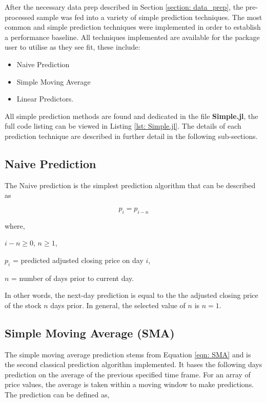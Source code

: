 After the necessary data prep described in Section \ref{section: data_prep}, the pre-processed sample was fed into a variety of simple prediction techniques. The most common and simple prediction techniques were implemented in order to establish a performance baseline. All techniques implemented are available for the package user to utilise as they see fit, these include:
\begin{itemize}
    \item Naive Prediction
    \item Simple Moving Average 
    \item Linear Predictors.
\end{itemize}

 \noindent All simple prediction methods are found and dedicated in the file \textbf{Simple.jl}, the full code listing can be viewed in Listing \ref{lst: Simple.jl}. The details of each prediction technique are described in further detail in the following sub-sections.
 
\subsection{Naive Prediction}

The Naive prediction is the simplest prediction algorithm that can be described as

\begin{equation}
    p_{i} = p_{i-n}
    \label{eqn: naive} 
\end{equation}

\noindent where, 

$i-n \geq 0$, $n \geq 1$, 

$p_i$ = predicted adjusted closing price on day $i$, 

$n$ = number of days prior to current day. 

\noindent In other words, the next-day prediction is equal to the the adjusted closing price of the stock $n$ days prior. In general, the selected value of $n$ is $n = 1$. 

\subsection{Simple Moving Average (SMA)}

The simple moving average prediction stems from Equation \ref{eqn: SMA} and is the second classical prediction algorithm implemented. It bases the following days prediction on the average of the previous specified time frame. For an array of price values, the average is taken within a moving window to make predictions. The prediction can be defined as, 


